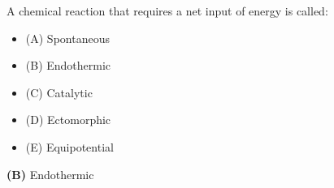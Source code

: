 

A chemical reaction that requires a net input of energy is called:

\begin{itemize}
\item{(A)} Spontaneous
\vskip 5pt 
\item{(B)} Endothermic
\vskip 5pt 
\item{(C)} Catalytic
\vskip 5pt 
\item{(D)} Ectomorphic
\vskip 5pt 
\item{(E)} Equipotential
\end{itemize}







{\bf (B)} Endothermic
 










